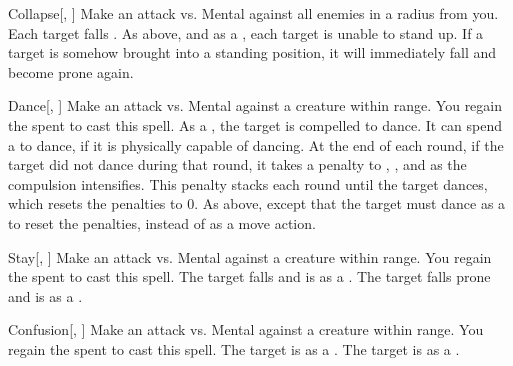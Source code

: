 \lowercase{\hypertarget{spell:Collapse}{}}\label{spell:Collapse}
\begin{apability}[\nth{1}]{\hypertarget{spell:Collapse}{Collapse}}[, ]
Make an attack vs. Mental against all enemies in a \areamed radius from you.
\hit Each target falls .
\crit As above, and as a , each target is unable to stand up.
If a target is somehow brought into a standing position, it will immediately fall and become prone again.
\end{apability}
\vspace{0.25em}



\lowercase{\hypertarget{spell:Dance}{}}\label{spell:Dance}
\begin{apability}[\nth{1}]{\hypertarget{spell:Dance}{Dance}}[, ]
Make an attack vs. Mental against a creature within \rngmed range.
\miss You regain the  spent to cast this spell.
\hit As a , the target is compelled to dance.
It can spend a  to dance, if it is physically capable of dancing.
At the end of each round, if the target did not dance during that round, it takes a  penalty to , , and  as the compulsion intensifies.
This penalty stacks each round until the target dances, which resets the penalties to 0.
\crit As above, except that the target must dance as a  to reset the penalties, instead of as a move action.
\end{apability}
\vspace{0.25em}



\lowercase{\hypertarget{spell:Stay}{}}\label{spell:Stay}
\begin{apability}[\nth{1}]{\hypertarget{spell:Stay}{Stay}}[, ]
Make an attack vs. Mental against a creature within \rngmed range.
\miss You regain the  spent to cast this spell.
\hit The target falls  and is  as a .
\crit The target falls prone and is  as a .
\end{apability}
\vspace{0.25em}



\lowercase{\hypertarget{spell:Confusion}{}}\label{spell:Confusion}
\begin{apability}[\nth{3}]{\hypertarget{spell:Confusion}{Confusion}}[, ]
Make an attack vs. Mental against a creature within \rngmed range.
\miss You regain the  spent to cast this spell.
\hit The target is \disoriented as a .
\crit The target is \confused as a .
\end{apability}
\vspace{0.25em}



